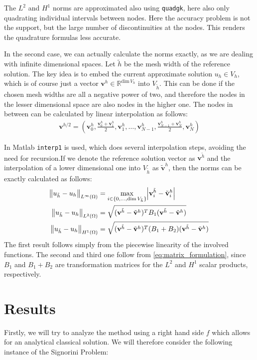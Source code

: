 \documentclass[headsepline,footsepline,footinclude=false,oneside,fontsize=11pt,paper=a4,listof=totoc,bibliography=totoc]{scrbook} %
\begin{document}
The $L^2$ and $H^1$ norms are approximated also using \verb|quadgk|, here also only quadrating individual intervals between nodes. Here the accuracy problem is not the support, but the large number of discontinuities at the nodes. This renders the quadrature formulas less accurate.

In the second case, we can actually calculate the norms exactly, as we are dealing with infinite dimensional spaces. Let $\tilde{h}$ be the mesh width of the reference solution. The key idea is to embed the current approximate solution $u_h \in V_h$, which is of course just a vector $\mathbf{v}^h \in \mathbb{R}^{\mathrm{dim}\, V_h}$ into $V_{\tilde{h}}$. This can be done if the chosen mesh widths are all a negative power of two, and therefore the nodes in the lesser dimensional space are also nodes in the higher one. The nodes in between can be calculated by linear interpolation as follows:
\begin{align*}
	\mathbf{v}^{h/2} = \left(\mathbf{v}^h_0, \frac{\mathbf{v}^h_0 + \mathbf{v}^h_1}{2} , \mathbf{v}^h_1, \dots, \mathbf{v}^h_{N-1}, \frac{\mathbf{v}^h_{N-1} + \mathbf{v}^h_N}{2}, \mathbf{v}^h_N \right)
\end{align*}

In Matlab \verb|interp1| is used, which does several interpolation steps, avoiding the need for recursion.If we denote the reference solution vector as $\mathbf{v}^{\tilde{h}}$ and the interpolation of a lower dimensional one into $V_{\tilde{h}}$ as $\tilde{\mathbf{v}}^h$, then the norms can be exactly calculated as follows:
\begin{align}
\norm{u_{\tilde{h}} - u_h}_{L^\infty(\Omega)} &= \max_{i \in \{0,\dots,\mathrm{dim} \, V_{\tilde{h}}\}} \abs{\mathbf{v}^{\tilde{h}}_i - \tilde{\mathbf{v}}^h_i} \\
\norm{u_{\tilde{h}} - u_h}_{L^2(\Omega)} &=  \sqrt{(\mathbf{v}^{\tilde{h}} - \tilde{\mathbf{v}}^h)^T B_1 (\mathbf{v}^{\tilde{h}} - \tilde{\mathbf{v}}^h)}\\
\norm{u_{\tilde{h}} - u_h}_{H^1(\Omega)} &= \sqrt{(\mathbf{v}^{\tilde{h}} - \tilde{\mathbf{v}}^h)^T (B_1+B_2) (\mathbf{v}^{\tilde{h}} - \tilde{\mathbf{v}}^h)}
\end{align}
The first result follows simply from the piecewise linearity of the involved functions. The second and third one follow from \eqref{eq:matrix_formulation}, since $B_1$ and $B_1 + B_2$ are transformation matrices for the $L^2$ and $H^1$ scalar products, respectively.
\section{Results}
Firstly, we will try to analyze the method using a right hand side $f$ which allows for an analytical classical solution. We will therefore consider the following instance of the Signorini Problem:
\end{document}
